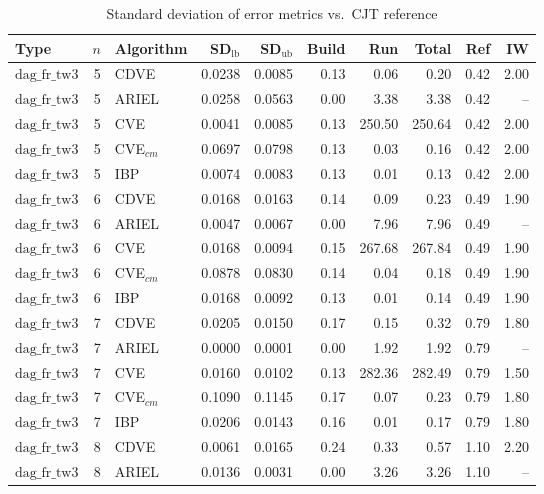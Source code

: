 \begin{table}[ht]
\centering
\scriptsize
\caption{Standard deviation of error metrics vs.\ CJT reference}
\begin{tabular}{lrlrrrrrrr}
\toprule
Type & $n$ & Algorithm & SD$_{\text{lb}}$ & SD$_{\text{ub}}$ & Build & Run & Total & Ref & IW \\
\midrule
$\text{dag\_fr\_tw3}$ & 5 & CDVE & 0.0238 & 0.0085 & 0.13 & 0.06 & 0.20 & 0.42 & 2.00 \\
$\text{dag\_fr\_tw3}$ & 5 & ARIEL & 0.0258 & 0.0563 & 0.00 & 3.38 & 3.38 & 0.42 & -- \\
$\text{dag\_fr\_tw3}$ & 5 & CVE & 0.0041 & 0.0085 & 0.13 & 250.50 & 250.64 & 0.42 & 2.00 \\
$\text{dag\_fr\_tw3}$ & 5 & CVE$_{cm}$ & 0.0697 & 0.0798 & 0.13 & 0.03 & 0.16 & 0.42 & 2.00 \\
$\text{dag\_fr\_tw3}$ & 5 & IBP & 0.0074 & 0.0083 & 0.13 & 0.01 & 0.13 & 0.42 & 2.00 \\
\hline
$\text{dag\_fr\_tw3}$ & 6 & CDVE & 0.0168 & 0.0163 & 0.14 & 0.09 & 0.23 & 0.49 & 1.90 \\
$\text{dag\_fr\_tw3}$ & 6 & ARIEL & 0.0047 & 0.0067 & 0.00 & 7.96 & 7.96 & 0.49 & -- \\
$\text{dag\_fr\_tw3}$ & 6 & CVE & 0.0168 & 0.0094 & 0.15 & 267.68 & 267.84 & 0.49 & 1.90 \\
$\text{dag\_fr\_tw3}$ & 6 & CVE$_{cm}$ & 0.0878 & 0.0830 & 0.14 & 0.04 & 0.18 & 0.49 & 1.90 \\
$\text{dag\_fr\_tw3}$ & 6 & IBP & 0.0168 & 0.0092 & 0.13 & 0.01 & 0.14 & 0.49 & 1.90 \\
\hline
$\text{dag\_fr\_tw3}$ & 7 & CDVE & 0.0205 & 0.0150 & 0.17 & 0.15 & 0.32 & 0.79 & 1.80 \\
$\text{dag\_fr\_tw3}$ & 7 & ARIEL & 0.0000 & 0.0001 & 0.00 & 1.92 & 1.92 & 0.79 & -- \\
$\text{dag\_fr\_tw3}$ & 7 & CVE & 0.0160 & 0.0102 & 0.13 & 282.36 & 282.49 & 0.79 & 1.50 \\
$\text{dag\_fr\_tw3}$ & 7 & CVE$_{cm}$ & 0.1090 & 0.1145 & 0.17 & 0.07 & 0.23 & 0.79 & 1.80 \\
$\text{dag\_fr\_tw3}$ & 7 & IBP & 0.0206 & 0.0143 & 0.16 & 0.01 & 0.17 & 0.79 & 1.80 \\
\hline
$\text{dag\_fr\_tw3}$ & 8 & CDVE & 0.0061 & 0.0165 & 0.24 & 0.33 & 0.57 & 1.10 & 2.20 \\
$\text{dag\_fr\_tw3}$ & 8 & ARIEL & 0.0136 & 0.0031 & 0.00 & 3.26 & 3.26 & 1.10 & -- \\

\end{tabular}
\end{table}
